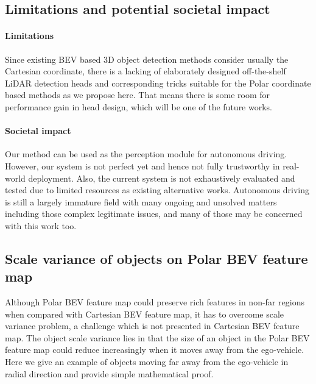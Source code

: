 \documentclass[letterpaper]{article} \usepackage{aaai23}  \usepackage{times}  \usepackage{helvet}  \usepackage{courier}  \usepackage[hyphens]{url}  \usepackage{graphicx} \urlstyle{rm} \def\UrlFont{\rm}  \usepackage{natbib}  \usepackage{caption} \frenchspacing  \setlength{\pdfpagewidth}{8.5in} \setlength{\pdfpageheight}{11in} \usepackage{algorithm}
\begin{document}
\subsection{Limitations and potential societal impact}
\paragraph{Limitations} Since existing BEV based 3D object detection methods 
consider usually the Cartesian coordinate,
there is a lacking of
elaborately designed off-the-shelf LiDAR detection heads and corresponding tricks suitable for the Polar coordinate based methods as we propose here.
That means there is some room for performance gain 
in head design, which will be one of the future works.

\paragraph{Societal impact} 
Our method can be used as the perception module for autonomous driving. However, our system is not perfect yet and hence not fully trustworthy in real-world deployment. Also, the current system is not exhaustively evaluated and tested due to limited resources as existing alternative works.
Autonomous driving is still a largely immature field with many ongoing and unsolved matters including those complex legitimate issues, and many of those may be concerned with this work too.

\subsection{Scale variance of objects on Polar BEV feature map}
Although Polar BEV feature map could preserve rich features in non-far regions when compared with Cartesian BEV feature map, it has to overcome scale variance problem, a challenge which is not presented in Cartesian BEV feature map. The object scale variance lies in that the size of an object in the Polar BEV feature map could reduce increasingly when it moves away from the ego-vehicle. Here we give an example of objects moving far away from the ego-vehicle in radial direction and provide simple mathematical proof. 
\end{document}
